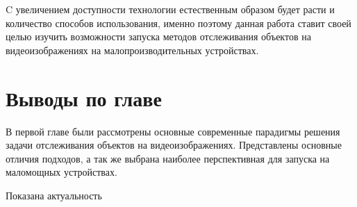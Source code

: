 C увеличением доступности технологии естественным образом будет расти и количество способов использования, 
именно поэтому данная работа ставит своей целью изучить возможности запуска методов отслеживания объектов на видеоизображениях на малопроизводительных устройствах.

\section{Выводы по главе}
В первой главе были рассмотрены основные современные парадигмы решения задачи отслеживания объектов на видеоизображениях.
Представлены основные отличия подходов, а так же выбрана наиболее перспективная для запуска на маломощных устройствах. 

Показана актуальность